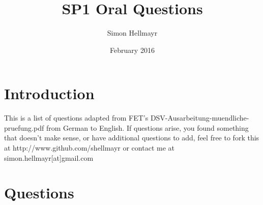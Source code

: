 \documentclass{article}
\title{SP1 Oral Questions}
\author{Simon Hellmayr}
\date{February 2016}
\begin{document}
\maketitle

\section{Introduction}
This is a list of questions adapted from FET's DSV-Ausarbeitung-muendliche-pruefung.pdf from German to English. If questions arise, you found something that doesn't make sense, or have additional questions to add, feel free to fork this at http://www.github.com/shellmayr or contact me at simon.hellmayr[at]gmail.com
\section{Questions}
\end{document}
